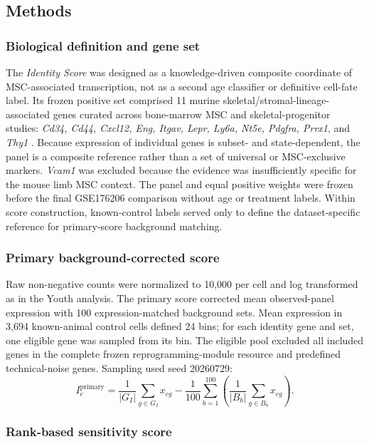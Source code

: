 \documentclass[10pt,twocolumn]{article}
\newcommand{\IdentityScore}{\textit{Identity Score}}
\begin{document}
\subsection{Methods}

\subsubsection{Biological definition and gene set}

The \IdentityScore{} was designed as a knowledge-driven composite coordinate of MSC-associated transcription, not as a second age classifier or definitive cell-fate label. Its frozen positive set comprised 11 murine skeletal/stromal-lineage-associated genes curated across bone-marrow MSC and skeletal-progenitor studies: \textit{Cd34, Cd44, Cxcl12, Eng, Itgav, Lepr, Ly6a, Nt5e, Pdgfra, Prrx1}, and \textit{Thy1} \citep{pisterzi2023,greenbaum2013,mo2022,morikawa2009}. Because expression of individual genes is subset- and state-dependent, the panel is a composite reference rather than a set of universal or MSC-exclusive markers. \textit{Vcam1} was excluded because the evidence was insufficiently specific for the mouse limb MSC context. The panel and equal positive weights were frozen before the final GSE176206 comparison without age or treatment labels. Within score construction, known-control labels served only to define the dataset-specific reference for primary-score background matching.

\subsubsection{Primary background-corrected score}

Raw non-negative counts were normalized to 10,000 per cell and log transformed as in the Youth analysis. The primary score corrected mean observed-panel expression with 100 expression-matched background sets. Mean expression in 3,694 known-animal control cells defined 24 bins; for each identity gene and set, one eligible gene was sampled from its bin. The eligible pool excluded all included genes in the complete frozen reprogramming-module resource and predefined technical-noise genes. Sampling used seed 20260729:
\begin{equation}
I_c^{\mathrm{primary}}=
\frac{1}{|G_I|}\sum_{g\in G_I}x_{cg}
-\frac{1}{100}\sum_{b=1}^{100}
\left(\frac{1}{|B_b|}\sum_{g\in B_b}x_{cg}\right).
\end{equation}

\subsubsection{Rank-based sensitivity score}
\end{document}
